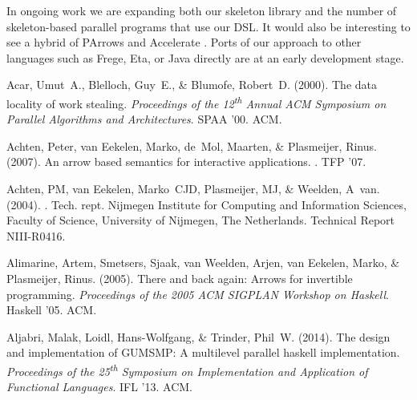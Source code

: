 \documentclass{jfp1}
\renewcommand{\cite}[1]{\citep{#1}}
\DeclareRobustCommand{\xth}{\textsuperscript{th}\xspace}
\DeclareRobustCommand{\xth}{\textsuperscript{th}\xspace}
\begin{document}
In ongoing work we are expanding 
both our skeleton library and the number of skeleton-based parallel programs that use our DSL.
It would also be interesting to see a hybrid of PArrows and Accelerate \cite{McDonell:2015:TRC:2887747.2804313}.
Ports of our approach to other languages such as Frege, Eta, or Java directly are at an early development stage.
        \providecommand{\noopsort}[1]{}
\begin{thebibliography}{}

Acar, Umut~A., Blelloch, Guy~E., \& Blumofe, Robert~D. (2000).
\newblock The data locality of work stealing.
 {\em Proceedings of the 12\xth Annual ACM
  Symposium on Parallel Algorithms and Architectures}.
\newblock SPAA '00.
\newblock ACM.

Achten, Peter, van Eekelen, Marko, de~Mol, Maarten, \& Plasmeijer, Rinus.
  (2007).
\newblock An arrow based semantics for interactive applications.
.
\newblock TFP '07.

Achten, PM, van Eekelen, Marko~CJD, Plasmeijer, MJ, \& Weelden, A~van. (2004).
.
\newblock Tech. rept. Nijmegen Institute for Computing and Information
  Sciences, Faculty of Science, University of Nijmegen, The Netherlands.
\newblock Technical Report NIII-R0416.

Alimarine, Artem, Smetsers, Sjaak, van Weelden, Arjen, van Eekelen, Marko, \&
  Plasmeijer, Rinus. (2005).
\newblock There and back again: Arrows for invertible programming.
 {\em Proceedings of the {2005} {ACM}
  {SIGPLAN} Workshop on {Haskell}}.
\newblock Haskell '05.
\newblock ACM.

Aljabri, Malak, Loidl, Hans-Wolfgang, \& Trinder, Phil~W. (2014).
\newblock The design and implementation of {GUMSMP}: A multilevel parallel
  haskell implementation.
 {\em Proceedings of the 25\xth
  Symposium on Implementation and Application of Functional Languages}.
\newblock IFL '13.
\newblock ACM.


\end{thebibliography}
\end{document}

